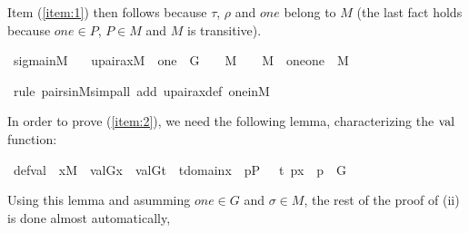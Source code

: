 Item (\ref{item:1}) then follows because $\tau$, $\rho$ and
$one$ belong to $M$ (the last fact holds because $one \in P$, $P \in M$ and
$M$ is transitive).

\begin{isabelle}
\isamarkupfalse%
\ sigma{\isacharunderscore}in{\isacharunderscore}M\ {\isacharcolon}\isanewline
\ \ {\isachardoublequoteopen}upair{\isacharunderscore}ax{\isacharparenleft}{\isacharhash}{\isacharhash}M{\isacharparenright}\ {\isasymLongrightarrow}\ one\ {\isasymin}\ G\ {\isasymLongrightarrow}\ {\isasymtau}\ {\isasymin}\ M\ {\isasymLongrightarrow}\ {\isasymrho}\ {\isasymin}\ M\ {\isasymLongrightarrow}\ {\isacharbraceleft}{\isasymlangle}{\isasymtau}{\isacharcomma}one{\isasymrangle}{\isacharcomma}{\isasymlangle}{\isasymrho}{\isacharcomma}one{\isasymrangle}{\isacharbraceright}\ {\isasymin}\ M{\isachardoublequoteclose}

\isamarkupfalse%
\ {\isacharparenleft}rule\ pairs{\isacharunderscore}in{\isacharunderscore}M{\isacharcomma}simp{\isacharunderscore}all\ add{\isacharcolon}\ upair{\isacharunderscore}ax{\isacharunderscore}def\ one{\isacharunderscore}in{\isacharunderscore}M{\isacharparenright}%
\end{isabelle}

In order to prove (\ref{item:2}), we need the following lemma, characterizing the $\operatorname{val}$ function:

\begin{isabelle}
\isamarkupfalse%
\ def{\isacharunderscore}val{\isacharcolon}\ \ {\isachardoublequoteopen}x{\isasymin}M\ {\isasymLongrightarrow}\ val{\isacharparenleft}G{\isacharcomma}x{\isacharparenright}\ {\isacharequal}\ {\isacharbraceleft}val{\isacharparenleft}G{\isacharcomma}t{\isacharparenright}\ {\isachardot}{\isachardot}\ t{\isasymin}domain{\isacharparenleft}x{\isacharparenright}\ {\isacharcomma}\ {\isasymexists}p{\isasymin}P\ {\isachardot}\ \ {\isasymlangle}t{\isacharcomma}\ p{\isasymrangle}{\isasymin}x\ {\isasymand}\ p\ {\isasymin}\ G\ {\isacharbraceright}{\isachardoublequoteclose}
\end{isabelle}


Using this lemma and asumming $one \in G$ and $\sigma \in M$, the rest of the proof of (ii) is done almost automatically, 

